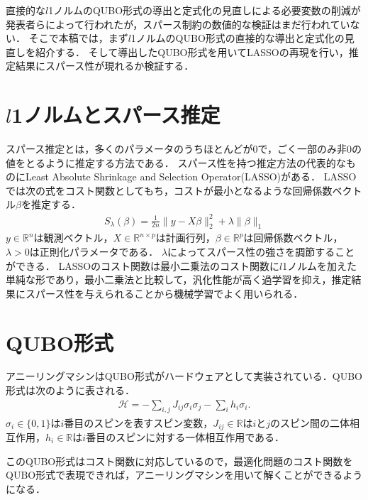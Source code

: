 \documentclass[technicalreport]{ieicej}
\begin{document}
直接的な$l$1ノルムのQUBO形式の導出と定式化の見直しによる必要変数の削減\cite{l1-norm}が発表者らによって行われたが，スパース制約の数値的な検証はまだ行われていない．
そこで本稿では，まず$l$1ノルムのQUBO形式の直接的な導出と定式化の見直しを紹介する．
そして導出したQUBO形式を用いてLASSOの再現を行い，推定結果にスパース性が現れるか検証する．

\section{$l$1ノルムとスパース推定}
スパース推定とは，多くのパラメータのうちほとんどが0で，ごく一部のみ非0の値をとるように推定する方法である．
スパース性を持つ推定方法の代表的なものにLeast Absolute Shrinkage and Selection Operator(LASSO)がある．
LASSOでは次の式をコスト関数としてもち，コストが最小となるような回帰係数ベクトル$\beta$を推定する．
\begin{eqnarray}
  S_{\lambda}(\beta)=\frac{1}{2n}\|y-X\beta\|^{2}_{2}+\lambda\|\beta\|_{1}
\end{eqnarray}
$y\in\mathbb{R}^{n}$は観測ベクトル，$X\in\mathbb{R}^{n\times p}$は計画行列，$\beta\in\mathbb{R}^{p}$は回帰係数ベクトル，$\lambda >0$は正則化パラメータである．
$\lambda$によってスパース性の強さを調節することができる．
LASSOのコスト関数は最小二乗法のコスト関数に$l$1ノルムを加えた単純な形であり，最小二乗法と比較して，汎化性能が高く過学習を抑え，推定結果にスパース性を与えられることから機械学習でよく用いられる．

\section{QUBO形式}
アニーリングマシンはQUBO形式がハードウェアとして実装されている．QUBO形式は次のように表される．
\begin{eqnarray}
  \mathcal{H} = -\sum_{i,j}{J_{ij}\sigma_{i}\sigma_{j}}-\sum_{i}{h_{i}\sigma_{i}}. \label{QUBO_model}
\end{eqnarray}
$\sigma_{i}\in\{ 0,1\}$は$i$番目のスピンを表すスピン変数，$J_{ij}\in\mathbb{R}$は$i$と$j$のスピン間の二体相互作用，$h_{i}\in\mathbb{R}$は$i$番目のスピンに対する一体相互作用である．

このQUBO形式はコスト関数に対応しているので，最適化問題のコスト関数をQUBO形式で表現できれば，アニーリングマシンを用いて解くことができるようになる．
\end{document}
